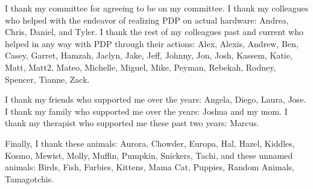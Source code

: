 I thank my committee for agreeing to be on my committee. I thank my colleagues who helped with the endeavor of realizing PDP on actual hardware: Andrea, Chris, Daniel, and Tyler. I thank the rest of my colleagues past and current who helped in any way with PDP through their actions: Alex, Alexis, Andrew, Ben, Casey, Garret, Hamzah, Jaclyn, Jake, Jeff, Johnny, Jon, Josh, Kassem, Katie, Matt, Matt2, Mateo, Michelle, Miguel, Mike, Peyman, Rebekah, Rodney, Spencer, Tianne, Zack.

I thank my friends who supported me over the years: Angela, Diego, Laura, Jose. I thank my family who supported me over the years: Joshua and my mom. I thank my therapist who supported me these past two years: Marcus.

Finally, I thank these animals: Aurora, Chowder, Europa, Hal, Hazel, Kiddles, Kosmo, Mewist, Molly, Muffin, Pumpkin, Snickers, Tachi, and these unnamed animals: Birds, Fish, Furbies, Kittens, Mama Cat, Puppies, Random Animals, Tamagotchis.
